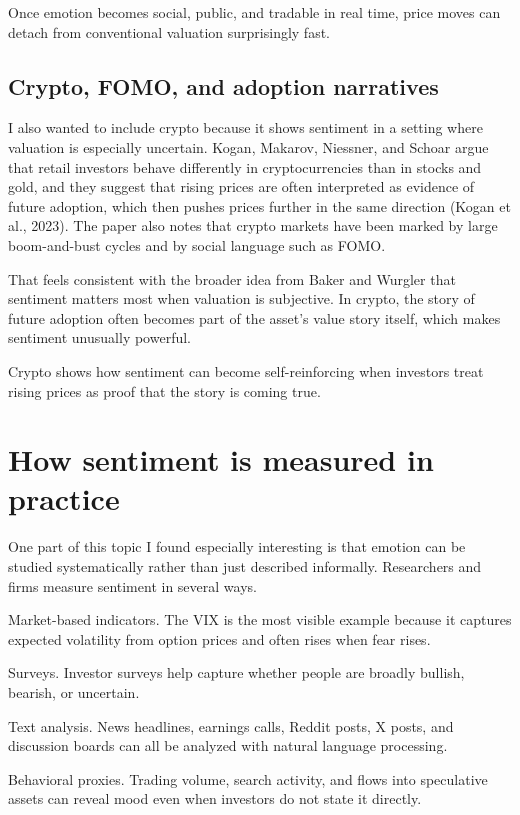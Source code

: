 \documentclass[12pt]{article}
\begin{document}
Once emotion becomes social, public, and tradable in real time, price moves can detach from conventional valuation surprisingly fast.

\subsection{Crypto, FOMO, and adoption narratives}

I also wanted to include crypto because it shows sentiment in a setting where valuation is especially uncertain. Kogan, Makarov, Niessner, and Schoar argue that retail investors behave differently in cryptocurrencies than in stocks and gold, and they suggest that rising prices are often interpreted as evidence of future adoption, which then pushes prices further in the same direction (Kogan et al., 2023). The paper also notes that crypto markets have been marked by large boom-and-bust cycles and by social language such as FOMO.

That feels consistent with the broader idea from Baker and Wurgler that sentiment matters most when valuation is subjective. In crypto, the story of future adoption often becomes part of the asset's value story itself, which makes sentiment unusually powerful.

Crypto shows how sentiment can become self-reinforcing when investors treat rising prices as proof that the story is coming true.

\section{How sentiment is measured in practice}

One part of this topic I found especially interesting is that emotion can be studied systematically rather than just described informally. Researchers and firms measure sentiment in several ways.

Market-based indicators. The VIX is the most visible example because it captures expected volatility from option prices and often rises when fear rises.

Surveys. Investor surveys help capture whether people are broadly bullish, bearish, or uncertain.

Text analysis. News headlines, earnings calls, Reddit posts, X posts, and discussion boards can all be analyzed with natural language processing.

Behavioral proxies. Trading volume, search activity, and flows into speculative assets can reveal mood even when investors do not state it directly.
\end{document}
